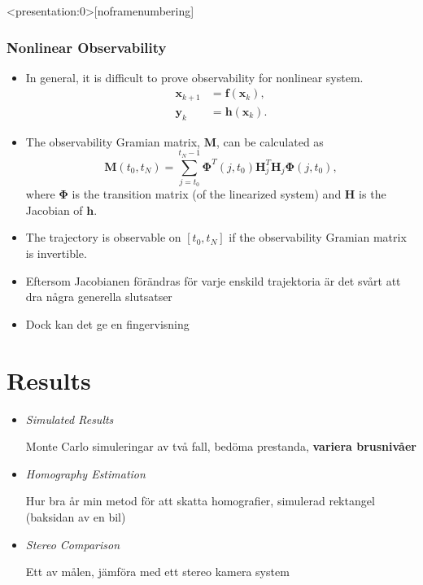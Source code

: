 \documentclass{beamer}
\renewcommand{\a}{\r{a}\xspace}
\renewcommand{\aa}{\"a\xspace}
\renewcommand{\o}{\"o\xspace}
\begin{document}
\begin{frame}<presentation:0>[noframenumbering]
	\frametitle{Nonlinear Observability}
	\begin{itemize}
		\item In general, it is difficult to prove observability for nonlinear system.
		\begin{align*}
			\bm{x}_{k+1} &= \bm{f}(\bm{x}_k), \\
			\bm{y}_k &= \bm{h}(\bm{x}_k).
		\end{align*}
		\item The observability Gramian matrix, $\bm{M}$, can be calculated as
		\begin{equation*}
			\bm{M}(t_0,t_N) = \sum_{j=t_0}^{t_N-1} \bm{\Phi}^T(j,t_0)\bm{H}^T_j\bm{H}_j\bm{\Phi}(j,t_0),
		\end{equation*}
		where $\bm{\Phi}$ is the transition matrix (of the linearized system) and $\bm{H}$ is the Jacobian of $\bm{h}$.
		\item The trajectory is observable on $[t_0, t_N]$ if the observability Gramian matrix is invertible.
	\end{itemize}

	\note
	{
		\begin{itemize}
			\item Eftersom Jacobianen f\o{}r\aa{}ndras f\o{}r varje enskild trajektoria \aa{}r det sv\a{}rt att dra n\a{}gra generella slutsatser
			\item Dock kan det ge en fingervisning
		\end{itemize}
	}
\end{frame}

\section{Results}

\note
{
	\begin{itemize}
		\item \textit{Simulated Results}

		Monte Carlo simuleringar av tv\a{} fall, bed\o{}ma prestanda, \textbf{variera brusniv\a{}er}

		\item \textit{Homography Estimation}

		Hur bra \a{}r min metod f\o{}r att skatta homografier, simulerad rektangel (baksidan av en bil)

		\item \textit{Stereo Comparison}

		Ett av m\a{}len, j\aa{}mf\o{}ra med ett stereo kamera system
	\end{itemize}
}
\end{document}
